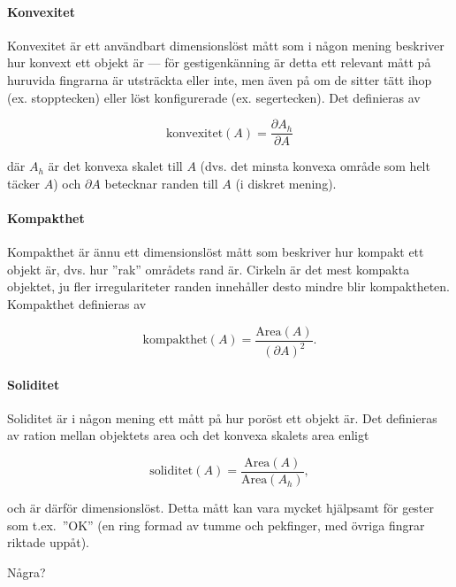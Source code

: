 \documentclass[../rapport_MVEX01-11-05]{subfiles}
\begin{document}

\paragraph{Konvexitet}

Konvexitet \cite[s.~26]{Rudemo09} är ett användbart dimensionslöst
mått som i någon mening beskriver hur konvext ett objekt är --- för
gestigenkänning är detta ett relevant mått på huruvida fingrarna är
utsträckta eller inte, men även på om de sitter tätt ihop (ex.
stopptecken) eller löst konfigurerade (ex. segertecken). Det
definieras av

\begin{equation*}
  \textrm{konvexitet}(A) = \frac{\partial A_h}{\partial A}
\end{equation*}

där $A_h$ är det konvexa skalet till $A$ (dvs. det minsta konvexa område som
helt täcker $A$) och $\partial A$ betecknar randen till $A$ (i diskret
mening).

\paragraph{Kompakthet}

Kompakthet \cite[s.~26]{Rudemo09} är ännu ett dimensionslöst mått som
beskriver hur kompakt ett objekt är, dvs. hur ''rak'' områdets rand
är. Cirkeln är det mest kompakta objektet, ju fler irregulariteter
randen innehåller desto mindre blir kompaktheten. Kompakthet
definieras av

\begin{equation*}
  \textrm{kompakthet}(A) = \frac{\textrm{Area}(A)}{\left(\partial
  A\right)^2}.
\end{equation*}

\paragraph{Soliditet}

Soliditet är i någon mening ett mått på hur poröst ett objekt är. Det
definieras av ration mellan objektets area och det konvexa skalets
area enligt

\begin{equation*}
  \textrm{soliditet}(A) = \frac{\textrm{Area}(A)}{\textrm{Area}(A_h)},
\end{equation*}

och är därför dimensionslöst. Detta mått kan vara mycket hjälpsamt för
gester som t.ex.~''OK'' (en ring formad av tumme och pekfinger, med
övriga fingrar riktade uppåt).

Några?
\end{document}

